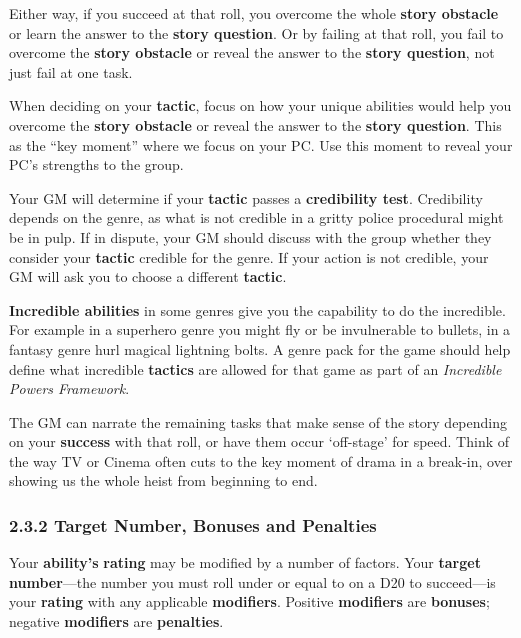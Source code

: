 \documentclass[
  11pt,
]{article}
\begin{document}
Either way, if you succeed at that roll, you overcome the whole
\textbf{story obstacle} or learn the answer to the \textbf{story
question}. Or by failing at that roll, you fail to overcome the
\textbf{story obstacle} or reveal the answer to the \textbf{story
question}, not just fail at one task.

When deciding on your \textbf{tactic}, focus on how your unique
abilities would help you overcome the \textbf{story obstacle} or reveal
the answer to the \textbf{story question}. This as the ``key moment''
where we focus on your PC. Use this moment to reveal your PC's strengths
to the group.

Your GM will determine if your \textbf{tactic} passes a
\textbf{credibility test}. Credibility depends on the genre, as what is
not credible in a gritty police procedural might be in pulp. If in
dispute, your GM should discuss with the group whether they consider
your \textbf{tactic} credible for the genre. If your action is not
credible, your GM will ask you to choose a different \textbf{tactic}.

\textbf{Incredible abilities} in some genres give you the capability to
do the incredible. For example in a superhero genre you might fly or be
invulnerable to bullets, in a fantasy genre hurl magical lightning
bolts. A genre pack for the game should help define what incredible
\textbf{tactics} are allowed for that game as part of an
\emph{Incredible Powers Framework}.

The GM can narrate the remaining tasks that make sense of the story
depending on your \textbf{success} with that roll, or have them occur
`off-stage' for speed. Think of the way TV or Cinema often cuts to the
key moment of drama in a break-in, over showing us the whole heist from
beginning to end.

\hypertarget{target-number-bonuses-and-penalties}{%
\subsubsection{2.3.2 Target Number, Bonuses and
Penalties}\label{target-number-bonuses-and-penalties}}

Your \textbf{ability's} \textbf{rating} may be modified by a number of
factors. Your \textbf{target number}---the number you must roll under or
equal to on a D20 to succeed---is your \textbf{rating} with any
applicable \textbf{modifiers}. Positive \textbf{modifiers} are
\textbf{bonuses}; negative \textbf{modifiers} are \textbf{penalties}.
\end{document}
